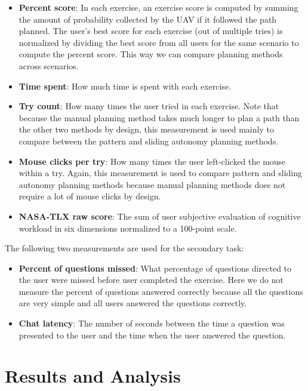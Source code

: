 \begin{itemize}
\item \textbf{Percent score}: In each exercise, an exercise score is computed by summing the amount of probability collected by the UAV if it followed the path planned. The user's best score for each exercise (out of multiple tries) is normalized by dividing the best score from all users for the same scenario to compute the percent score. This way we can compare planning methods across scenarios.
\item \textbf{Time spent}: How much time is spent with each exercise.
\item \textbf{Try count}: How many times the user tried in each exercise. Note that because the manual planning method takes much longer to plan a path than the other two methods by design, this measurement is used mainly to compare between the pattern and sliding autonomy planning methods.
\item \textbf{Mouse clicks per try}: How many times the user left-clicked the mouse within a try. Again, this measurement is used to compare pattern and sliding autonomy planning methods because manual planning methods does not require a lot of mouse clicks by design.
\item \textbf{NASA-TLX raw score}: The sum of user subjective evaluation of cognitive workload in six dimensions normalized to a 100-point scale. 
\end{itemize}

The following two measurements are used for the secondary task:
\begin{itemize}
\item \textbf{Percent of questions missed}: What percentage of questions directed to the user were missed before user completed the exercise. Here we do not measure the percent of questions answered correctly because all the questions are very simple and all users answered the questions correctly.
\item \textbf{Chat latency}: The number of seconds between the time a question was presented to the user and the time when the user answered the question.
\end{itemize}

\section{Results and Analysis} 
\label{sec:Results}

